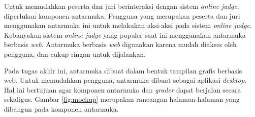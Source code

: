 \par Untuk memudahkan peserta dan juri berinteraksi dengan sistem \textit{online judge}, diperlukan komponen antarmuka. Pengguna yang merupakan peserta dan juri menggunakan antarmuka ini untuk melakukan aksi-aksi pada sistem \textit{online judge}. Kebanyakan sistem \textit{online judge} yang populer saat ini menggunakan antarmuka berbasis \textit{web}. Antarmuka berbasis \textit{web} digunakan karena mudah diakses oleh pengguna, dan cukup ringan untuk dijalankan.

\par Pada tugas akhir ini, antarmuka dibuat dalam bentuk tampilan grafis berbasis web. Untuk memudahkan pengguna, antarmuka dibuat sebagai aplikasi \textit{desktop}. Hal ini bertujuan agar komponen antarmuka dan \textit{grader} dapat berjalan secara sekaligus. Gambar \ref{fig:mockup} merupakan rancangan halaman-halaman yang dibangun pada komponen antarmuka.

